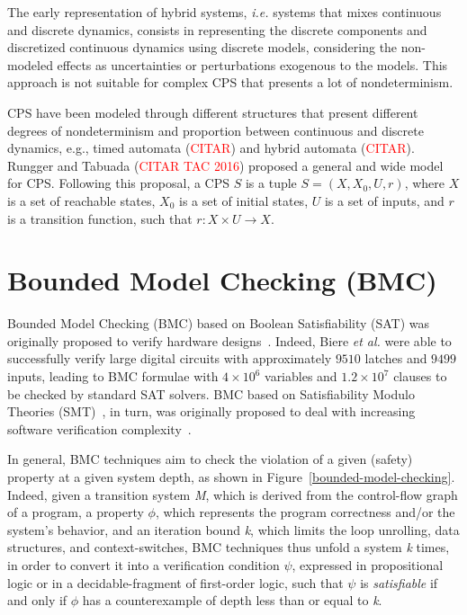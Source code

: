 \documentclass{acm_sen_article}
\begin{document}
The early representation of hybrid systems, {\it i.e.} systems that mixes continuous and discrete dynamics, consists in representing the discrete components and discretized continuous dynamics using discrete models, considering the non-modeled effects as uncertainties or perturbations exogenous to the models. This approach is not suitable for complex CPS that presents a lot of nondeterminism.

CPS have been modeled through different structures that present different degrees of nondeterminism and proportion between continuous and discrete dynamics, e.g., timed automata (\textcolor{red}{CITAR}) and hybrid automata (\textcolor{red}{CITAR}). Rungger and Tabuada (\textcolor{red}{CITAR TAC 2016}) proposed a general and wide model for CPS. Following this proposal, a CPS $S$ is a tuple $S=(X,X_{0},U,r)$, where $X$ is a set of reachable states, $X_{0}$ is a set of initial states, $U$ is a set of inputs, and $r$ is a transition function, such that $r:X\times U \rightarrow X$.

\section{Bounded Model Checking (BMC)}
\label{Preliminaries}

Bounded Model Checking (BMC) based on Boolean Satisfiability (SAT) was originally proposed to verify hardware designs~\cite{Biere99,handbook09}. Indeed, Biere {\it et al.} were able to successfully verify large digital circuits with approximately $9510$ latches and $9499$ inputs, leading to BMC formulae with $4 \times 10^6$ variables and $1.2 \times 10^7$ clauses to be checked by standard SAT solvers. BMC based on Satisfiability Modulo Theories (SMT)~\cite{BarrettSST09}, in turn, was originally proposed to deal with increasing software verification complexity~\cite{Armando06}. 

In general, BMC techniques aim to check the violation of a given (safety) property at a given system depth, as shown in Figure~\ref{bounded-model-checking}. Indeed, given a transition system \textit{M}, which is derived from the control-flow graph of a program, a property $\phi$, which represents the program correctness and/or the system's behavior, and an iteration bound \textit{k}, which limits the loop unrolling, data structures, and context-switches, BMC techniques thus unfold a system \textit{k} times, in order to convert it into a verification condition $\psi$, expressed in propositional logic or in a decidable-fragment of first-order logic, such that $\psi$ is \textit{satisfiable} if and only if $\phi$ has a counterexample of depth less than or equal to \textit{k}.
\end{document}

